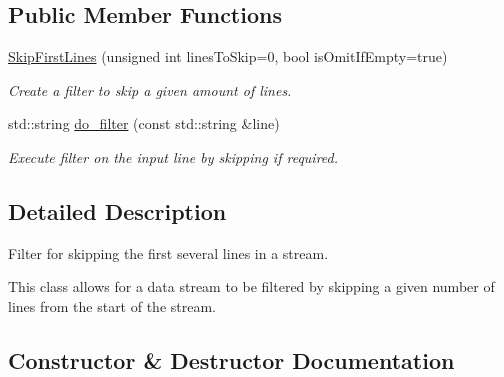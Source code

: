 \subsection*{Public Member Functions}
\begin{DoxyCompactItemize}
\item 
\hyperlink{classtudat_1_1input__output_1_1stream__filters_1_1SkipFirstLines_aa5afe3401fd4348b9840504ab346e40b}{Skip\+First\+Lines} (unsigned int lines\+To\+Skip=0, bool is\+Omit\+If\+Empty=true)
\begin{DoxyCompactList}\small\item\em Create a filter to skip a given amount of lines. \end{DoxyCompactList}\item 
std\+::string \hyperlink{classtudat_1_1input__output_1_1stream__filters_1_1SkipFirstLines_a39193974df3b34e1618e51cca1070cb4}{do\+\_\+filter} (const std\+::string \&line)
\begin{DoxyCompactList}\small\item\em Execute filter on the input line by skipping if required. \end{DoxyCompactList}\end{DoxyCompactItemize}


\subsection{Detailed Description}
Filter for skipping the first several lines in a stream. 

This class allows for a data stream to be filtered by skipping a given number of lines from the start of the stream. 

\subsection{Constructor \& Destructor Documentation}
